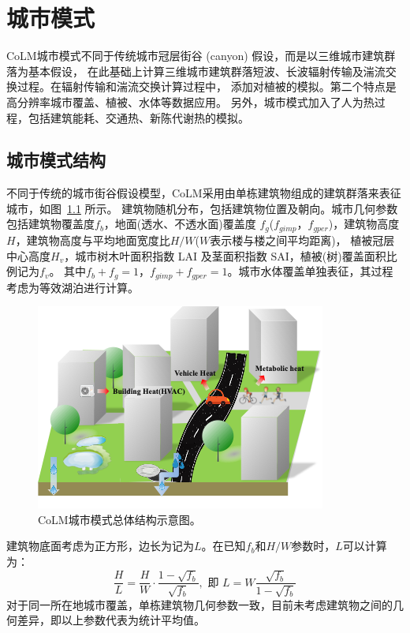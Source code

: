 \chapter{城市模式}\label{城市模式}
CoLM城市模式不同于传统城市冠层街谷 (canyon) 假设，而是以三维城市建筑群落为基本假设，
在此基础上计算三维城市建筑群落短波、长波辐射传输及湍流交换过程。在辐射传输和湍流交换计算过程中，
添加对植被的模拟。第二个特点是高分辨率城市覆盖、植被、水体等数据应用。
另外，城市模式加入了人为热过程，包括建筑能耗、交通热、新陈代谢热的模拟。


\section{城市模式结构}
不同于传统的城市街谷假设模型，CoLM采用由单栋建筑物组成的建筑群落来表征城市，如图~\ref{fig:CoLM城市模式总体结构示意图} 所示。
建筑物随机分布，包括建筑物位置及朝向。城市几何参数包括建筑物覆盖度$f_b$，地面(透水、不透水面)覆盖度
$f_g$($f_{gimp}$，$f_{gper}$)，建筑物高度$H$，建筑物高度与平均地面宽度比$H/W$($W$表示楼与楼之间平均距离)，
植被冠层中心高度$H_v$，城市树木叶面积指数 LAI 及茎面积指数 SAI，植被(树)覆盖面积比例记为$f_v$。
其中$f_b+f_g=1$，$f_{gimp}+f_{gper}=1$。城市水体覆盖单独表征，其过程考虑为等效湖泊进行计算。
{
\begin{figure}[]
\centering
\includegraphics{Figures/城市模式/CoLM城市模式总体结构示意图.png}
\caption{CoLM城市模式总体结构示意图。}
\label{fig:CoLM城市模式总体结构示意图}
\end{figure}
}

建筑物底面考虑为正方形，边长为记为$L$。在已知$f_b$和$H/W$参数时，$L$可以计算为：
\begin{equation}
\frac{H}{L}=\frac{H}{W} \cdot \frac{1-\sqrt{f_{b}}}{\sqrt{f_{b}}}, \text { 即 } L=W \frac{\sqrt{f_{b}}}{1-\sqrt{f_{b}}}
\end{equation}
对于同一所在地城市覆盖，单栋建筑物几何参数一致，目前未考虑建筑物之间的几何差异，即以上参数代表为统计平均值。

